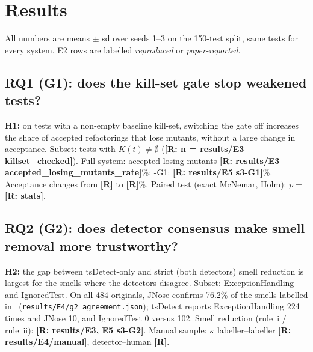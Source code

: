 \section{Results}\label{sec:results}

All numbers are means $\pm$ sd over seeds 1--3 on the 150-test split, same tests for every system. E2 rows are labelled \emph{reproduced} or \emph{paper-reported}.

\subsection{RQ1 (G1): does the kill-set gate stop weakened tests?}
\textbf{H1:} on tests with a non-empty baseline kill-set, switching the gate off increases the share of accepted refactorings that lose mutants, without a large change in acceptance.
Subset: tests with $K(t)\neq\emptyset$ (\textbf{[R: n = results/E3 killset\_checked]}). Full system: accepted-losing-mutants \textbf{[R: results/E3 accepted\_losing\_mutants\_rate]}\%;
\textsf{-G1}: \textbf{[R: results/E5 s3-G1]}\%. Acceptance changes from \textbf{[R]} to \textbf{[R]}\%. Paired test (exact McNemar, Holm): $p=$ \textbf{[R: stats]}.

\subsection{RQ2 (G2): does detector consensus make smell removal more trustworthy?}
\textbf{H2:} the gap between tsDetect-only and strict (both detectors) smell reduction is largest for the smells where the detectors disagree.
Subset: ExceptionHandling and IgnoredTest. On all 484 originals, JNose confirms 76.2\% of the smells labelled in~\cite{utrefactor} (\texttt{results/E4/g2\_agreement.json});
tsDetect reports ExceptionHandling 224 times and JNose 10, and IgnoredTest 0 versus 102. Smell reduction (rule~i / rule~ii): \textbf{[R: results/E3, E5 s3-G2]}.
Manual sample: $\kappa$ labeller--labeller \textbf{[R: results/E4/manual]}, detector--human \textbf{[R]}.


